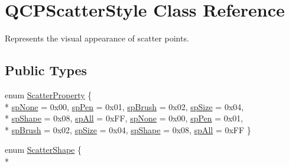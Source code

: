 \hypertarget{class_q_c_p_scatter_style}{}\section{Q\+C\+P\+Scatter\+Style Class Reference}
\label{class_q_c_p_scatter_style}


Represents the visual appearance of scatter points.  


\subsection*{Public Types}
\begin{DoxyCompactItemize}
\item 
enum \hyperlink{class_q_c_p_scatter_style_a8974f6a20f8f6eea7781f0e6af9deb46}{Scatter\+Property} \{ \\*
\hyperlink{class_q_c_p_scatter_style_a8974f6a20f8f6eea7781f0e6af9deb46a17a52f70663e0d2f4e1593d1e777a35d}{sp\+None} = 0x00, 
\hyperlink{class_q_c_p_scatter_style_a8974f6a20f8f6eea7781f0e6af9deb46a1b8f3179d60006d2bcfd4e14a3fcde79}{sp\+Pen} = 0x01, 
\hyperlink{class_q_c_p_scatter_style_a8974f6a20f8f6eea7781f0e6af9deb46afad8a949ce16cff5c03b83ba31345722}{sp\+Brush} = 0x02, 
\hyperlink{class_q_c_p_scatter_style_a8974f6a20f8f6eea7781f0e6af9deb46abb1c95b5c063a6208703b5f956f8944d}{sp\+Size} = 0x04, 
\\*
\hyperlink{class_q_c_p_scatter_style_a8974f6a20f8f6eea7781f0e6af9deb46acfd6bcce3cc09ebc10723b2408412087}{sp\+Shape} = 0x08, 
\hyperlink{class_q_c_p_scatter_style_a8974f6a20f8f6eea7781f0e6af9deb46a69453dd56c0b1b0f51c877820caceeaa}{sp\+All} = 0x\+FF, 
\hyperlink{class_q_c_p_scatter_style_a8974f6a20f8f6eea7781f0e6af9deb46a17a52f70663e0d2f4e1593d1e777a35d}{sp\+None} = 0x00, 
\hyperlink{class_q_c_p_scatter_style_a8974f6a20f8f6eea7781f0e6af9deb46a1b8f3179d60006d2bcfd4e14a3fcde79}{sp\+Pen} = 0x01, 
\\*
\hyperlink{class_q_c_p_scatter_style_a8974f6a20f8f6eea7781f0e6af9deb46afad8a949ce16cff5c03b83ba31345722}{sp\+Brush} = 0x02, 
\hyperlink{class_q_c_p_scatter_style_a8974f6a20f8f6eea7781f0e6af9deb46abb1c95b5c063a6208703b5f956f8944d}{sp\+Size} = 0x04, 
\hyperlink{class_q_c_p_scatter_style_a8974f6a20f8f6eea7781f0e6af9deb46acfd6bcce3cc09ebc10723b2408412087}{sp\+Shape} = 0x08, 
\hyperlink{class_q_c_p_scatter_style_a8974f6a20f8f6eea7781f0e6af9deb46a69453dd56c0b1b0f51c877820caceeaa}{sp\+All} = 0x\+FF
 \}
\item 
enum \hyperlink{class_q_c_p_scatter_style_adb31525af6b680e6f1b7472e43859349}{Scatter\+Shape} \{ \\*

\end{DoxyCompactItemize}
